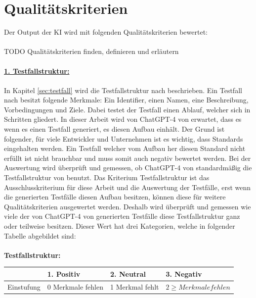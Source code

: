 \documentclass[12pt,toc=bib,toc=listof]{scrreprt}
\begin{document}
\section{Qualitätskriterien} %
\label{sec:qualitätskriterien}
Der Output der KI wird mit folgenden Qualitätskriterien bewertet:\\
\\
TODO Qualitätskriterien finden, definieren und erläutern\\
\\
\textbf{\underline{1. Testfallstruktur:}}\\
\\
In Kapitel \ref{sec:testfall} wird die Testfallstruktur nach \textcite{IsoIecIeee2024} beschrieben. Ein Testfall nach \textcite{IsoIecIeee2024} besitzt folgende Merkmale: Ein Identifier, einen Namen, eine Beschreibung, Vorbedingungen und Ziele. Dabei testet der Testfall einen Ablauf, welcher sich in Schritten gliedert. In dieser Arbeit wird von ChatGPT-4 von \textcite{OpenAI2025} erwartet, dass es wenn es einen Testfall generiert, es diesen Aufbau einhält. Der Grund ist folgender, für viele Entwickler und Unternehmen ist es wichtig, dass Standards eingehalten werden. Ein Testfall welcher vom Aufbau her diesen Standard nicht erfüllt ist nicht brauchbar und muss somit auch negativ bewertet werden. Bei der Auswertung wird überprüft und gemessen, ob ChatGPT-4 von \textcite{OpenAI2025} standardmäßig die Testfallstruktur von \textcite{IsoIecIeee2024} benutzt. Das Kriterium Testfallstruktur ist das Ausschlusskriterium für diese Arbeit und die Auswertung der Testfälle, erst wenn die generierten Testfälle diesen Aufbau besitzen, können diese für weitere Qualitätskriterien ausgewertet werden. Deshalb wird überprüft und gemessen wie viele der von ChatGPT-4 von \textcite{OpenAI2025} generierten Testfälle diese Testfallstruktur ganz oder teilweise besitzen. Dieser Wert hat drei Kategorien, welche in folgender Tabelle abgebildet sind:\\
\\
\textbf{Testfallstruktur:}
\begin{table}[H]
\begin{tabular}{|l|l|l|l|}
\hline
               & 1. Positiv & 2. Neutral & 3. Negativ  \\ \hline
Einstufung  & 0 Merkmale fehlen       & 1 Merkmal fehlt        & $2 \geq Merkmale fehlen$        \\ \hline

\end{tabular}
\end{table}
\end{document}
